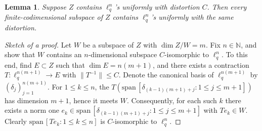 \documentclass{amsart}
\theoremstyle{plain}
\newtheorem{lemma}[theorem]{Lemma}
\theoremstyle{definition}
\numberwithin{equation}{section}
\newcommand{\N}{\mathbb{N}}
\newcommand{\R}{\mathbb{R}}
\newcommand{\spn}{\textrm{span}\,}
\newcommand{\vr}{\varepsilon}
\newcommand{\ball}{\mathrm{B}}
\begin{document}
\begin{lemma}\label{fin codim subspaces}
Suppose $Z$ contains $\ell_q^n$'s uniformly with distortion $C$. Then every finite-codimensional subspace of $Z$ contains $\ell_q^n$'s uniformly with the same distortion.
\end{lemma}
\begin{proof}[Sketch of a proof]
Let $W$ be a subspace of $Z$ with $\dim Z/W = m$. Fix $n \in \N$, and show that $W$ contains an $n$-dimensional subspace $C$-isomorphic to $\ell_q^n$. To this end, find $E \subset Z$ such that $\dim E = n(m+1)$, and there exists a contraction $T : \ell_q^{n(m+1)} \to E$ with $\|T^{-1}\| \leq C$.
Denote the canonical basis of $\ell_q^{n(m+1)}$ by $(\delta_j)_{j=1}^{n(m+1)}$. For $1 \leq k \leq n$, the $T(\spn[\delta_{(k-1)(m+1) + j} : 1 \leq j \leq m+1])$ has dimension $m+1$, hence it meets $W$.
Consequently, for each such $k$ there exists a norm one $e_k \in \spn[\delta_{(k-1)(m+1) + j} : 1 \leq j \leq m+1]$ with $Te_k \in W$. Clearly $\spn[Te_k : 1 \leq k \leq n]$ is $C$-isomorphic to $\ell_q^n$.
%

\end{proof}
\end{document}

